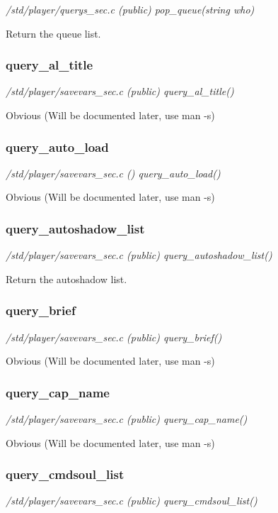 {\em /std/player/querys\_sec.c (public) pop\_queue(string who)}

Return the queue list.


\subsubsection{query\_al\_title}

{\em /std/player/savevars\_sec.c (public) query\_al\_title()}

Obvious (Will be documented later, use man -s)


\subsubsection{query\_auto\_load}

{\em /std/player/savevars\_sec.c () query\_auto\_load()}

Obvious (Will be documented later, use man -s)


\subsubsection{query\_autoshadow\_list}

{\em /std/player/savevars\_sec.c (public) query\_autoshadow\_list()}

Return the autoshadow list.


\subsubsection{query\_brief}

{\em /std/player/savevars\_sec.c (public) query\_brief()}

Obvious (Will be documented later, use man -s)


\subsubsection{query\_cap\_name}

{\em /std/player/savevars\_sec.c (public) query\_cap\_name()}

Obvious (Will be documented later, use man -s)


\subsubsection{query\_cmdsoul\_list}

{\em /std/player/savevars\_sec.c (public) query\_cmdsoul\_list()}

